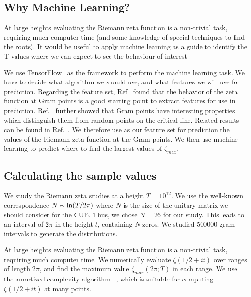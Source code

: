 \documentclass[twoside]{article}
\begin{document}
\subsection{\label{secwhy}Why Machine Learning?}

At large heights evaluating the Riemann zeta function  is a non-trivial task, requiring much computer time 
(and some knowledge of special techniques to find the roots).  It would be useful to apply
machine learning
as a guide to identify the T values where we can expect to see the behaviour of interest.

We use TensorFlow~\cite{FrancoisChollet 2021} as the framework to perform the machine learning 
task. We have to   decide what algorithm we should use, and what features we will use for prediction.
Regarding the feature set, 
Ref~\cite{osneural} found that the behavior of the zeta function at Gram points 
is a good starting point to extract features for use in prediction. 
Ref.~\cite{Shanker 2018a} further showed that Gram points have interesting properties 
which distinguish them from random points on the critical line. 
Related  results can be found in Ref.~\cite{os6, Shanker 2018b,Shanker 2020}. We therefore
use as our feature set for prediction the values of the Riemann zeta function at the Gram points.
We then use machine learning to predict where to find the largest values of $\zeta_{max}$.

\subsection{\label{seccalc}Calculating the sample values}

We study the Riemann zeta studies  at a
height $T = 10^{12}$. We use the well-known correspondence $N \thicksim \ln(T/2\pi)$ where $N$ 
is the size of the unitary matrix we should consider for the CUE. Thus, we chose $N = 26$ for our
study.  This leads to an interval of $2\pi$ in the height $t$,  containing $N$ zeros.
We studied $500000$ gram intervals  to generate the distributions.

At large heights evaluating the Riemann zeta function  is a non-trivial task, requiring much computer time. 
We numerically evaluate $\zeta(1/2 + it)$ over ranges of length $2\pi$, 
 and find the maximum value $\zeta_{max}(2\pi; T )$ in each range. 
 We use the amortized complexity algorithm ~\cite{hiary}, 
 which is suitable for computing $\zeta(1/2 + it)$ at many points.
\end{document}
